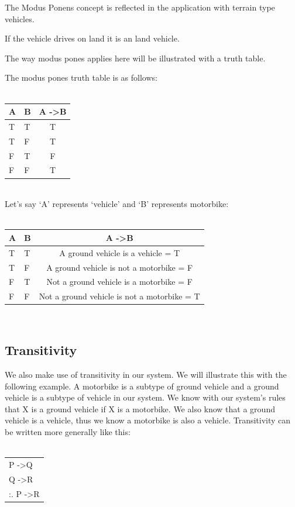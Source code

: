 The Modus Ponens concept is reflected in the application with terrain type vehicles.

If the vehicle drives on land it is an land vehicle.

The way modus pones applies here will be illustrated with a truth table.

The modus pones truth table is as follows:\\
~\\
\begin{tabular}{ l l | c }
  A & B & A -\textgreater B \\ \hline
  T & T & T \\
  T & F & T \\
  F & T & F \\
  F & F & T \\
\end{tabular}
~\\

Let's say `A' represents `vehicle'
and `B' represents motorbike:\\
~\\
\begin{tabular}{ l l | c }
  A & B & A -\textgreater B \\ \hline
  T & T & A ground vehicle is a vehicle = T \\
  T & F & A ground vehicle is not a motorbike = F \\
  F & T & Not a ground vehicle is a motorbike = F \\
  F & F & Not a ground vehicle is not a motorbike = T \\
\end{tabular}
~\\

\subsection{Transitivity} \label{man-logic-transitivity}
We also make use of transitivity in our system.
We will illustrate this with the following example.
A motorbike is a subtype of ground vehicle
and a ground vehicle is a subtype of
vehicle in our system. We know with our system's rules
that X is a ground vehicle if X is a motorbike.
We also know that a ground vehicle is a vehicle, thus we know
a motorbike is also a vehicle.
Transitivity can be written more generally like this:\\
~\\
\begin{tabular}{ l }
  P -\textgreater Q \\
  Q -\textgreater R \\ \hline
  :. P -\textgreater R \\
\end{tabular}
\newpage
